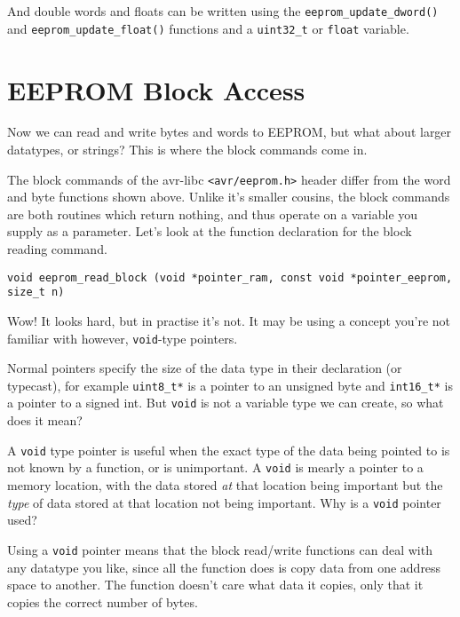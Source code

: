 \documentclass[a4paper,oneside,notitlepage]{book}
\begin{document}
And double words and floats can be written using the \lstinline{eeprom_update_dword()} and \lstinline{eeprom_update_float()} functions and a \lstinline{uint32_t} or \lstinline{float} variable.


\chapter{EEPROM Block Access}

Now we can read and write bytes and words to EEPROM, but what about larger datatypes, or strings? This is where the block commands come in.

The block commands of the avr-libc \lstinline{<avr/eeprom.h>} header differ from the word and byte functions shown above. Unlike it's smaller cousins, the block commands are both routines which return nothing, and thus operate on a variable you supply as a parameter. Let's look at the function declaration for the block reading command.

\begin{center}
\begin{lstlisting}
void eeprom_read_block (void *pointer_ram, const void *pointer_eeprom, size_t n)
\end{lstlisting}
\end{center}

Wow! It looks hard, but in practise it's not. It may be using a concept you're not familiar with however, \lstinline{void}-type pointers.

Normal pointers specify the size of the data type in their declaration (or typecast), for example \lstinline{uint8_t*} is a pointer to an unsigned byte and \lstinline{int16_t*} is a pointer to a signed int. But \lstinline{void} is not a variable type we can create, so what does it mean?

A \lstinline{void} type pointer is useful when the exact type of the data being pointed to is not known by a function, or is unimportant. A \lstinline{void} is mearly a pointer to a memory location, with the data stored \textit{at} that location being important but the \textit{type} of data stored at that location not being important. Why is a \lstinline{void} pointer used?

Using a \lstinline{void} pointer means that the block read/write functions can deal with any datatype you like, since all the function does is copy data from one address space to another. The function doesn't care what data it copies, only that it copies the correct number of bytes.
\end{document}
